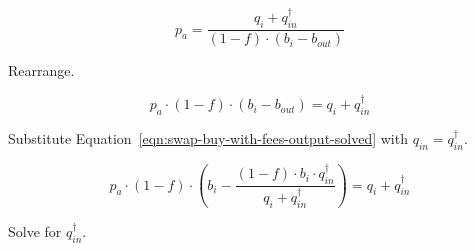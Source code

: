 \documentclass[table, twocolumn]{article}
\begin{document}
\begin{equation}
  p_a = \frac{q_i + q_{in}^{\dagger}}{(1 - f) \cdot (b_i - b_{out})} \nonumber
\end{equation}

Rearrange.

\begin{equation}
  p_a \cdot (1 - f) \cdot (b_i - b_{out}) = q_i + q_{in}^{\dagger} \nonumber
\end{equation}

Substitute Equation~\ref{eqn:swap-buy-with-fees-output-solved} with
$q_{in} = q_{in}^{\dagger}$.

\begin{equation}
  p_a \cdot (1 - f) \cdot
  \left(b_i - \frac{(1 - f) \cdot b_i \cdot q_{in}^{\dagger}}
  {q_i + q_{in}^{\dagger}}\right) =
  q_i + q_{in}^{\dagger} \nonumber
\end{equation}

Solve for $q_{in}^{\dagger}$.
\end{document}
